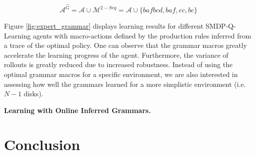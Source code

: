 \documentclass[10pt,letterpaper]{article}
\begin{document}
$$\mathcal{A}^{\hat{G}} = \mathcal{A} \cup \mathcal{M}^{2-Seq} = \mathcal{A} \cup \{bafbcd, baf, ec, bc\}$$


Figure \ref{fig:expert_grammar} displays learning results for different SMDP-Q-Learning agents with macro-actions defined by the production rules inferred from a trace of the optimal policy. One can observe that the grammar macros greatly accelerate the learning progress of the agent. Furthermore, the variance of rollouts is greatly reduced due to increased robustness. Instead of using the optimal grammar macros for a specific environment, we are also interested in assessing how well the grammars learned for a more simplistic environment (i.e. $N-1$ disks).  


%


\textbf{Learning with Online Inferred Grammars.}

%

\section{Conclusion}
\end{document}
